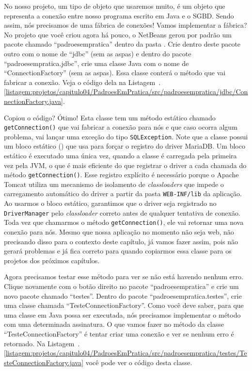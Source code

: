 No nosso projeto, um tipo de objeto que usaremos muito, é um objeto que representa a conexão entre nosso programa escrito em Java e o SGBD. Sendo assim, nós precisamos de uma fábrica de conexões! Vamos implementar a fábrica? No projeto que você criou agora há pouco, o NetBeans gerou por padrão um pacote chamado ``padroesempratica'' dentro da pasta . Crie dentro deste pacote outro com o nome de ``jdbc'' (sem as aspas) e dentro do pacote ``padroesempratica.jdbc'', crie uma classe Java com o nome de ``ConnectionFactory'' (sem as aspas). Essa classe conterá o método que vai fabricar a conexão. Veja o código dela na Listagem~\thechapter.\ref{listagem:projetos/capitulo04/PadroesEmPratica/src/padroesempratica/jdbc/ConnectionFactory.java}.


Copiou o código? Ótimo! Esta classe tem um método estático chamado \texttt{getConnection()} que vai fabricar a conexão para nós e que caso ocorra algum problema, vai lançar uma exceção do tipo \texttt{SQLException}. Note que a classe possui um bloco estático () que usa  para forçar o registro do driver MariaDB. Um bloco estático é executado uma única vez, quando a classe é carregada pela primeira vez pela JVM, o que é mais eficiente do que registrar o driver a cada chamada do método \texttt{getConnection()}. Esse registro explícito é necessário porque o Apache Tomcat utiliza um mecanismo de isolamento de \textit{classloaders} que impede o carregamento automático do driver a partir da pasta \texttt{WEB-INF/lib} da aplicação. Ao usarmos o bloco estático, garantimos que o driver seja registrado no \texttt{DriverManager} pelo \textit{classloader} correto antes de qualquer tentativa de conexão. Toda vez que chamarmos o método \texttt{getConnection()}, ele vai retornar uma nova conexão para nós. Mesmo que nossa aplicação no momento não seja web, não precisando disso para o contexto deste capítulo, já vamos fazer assim, pois não gerará problemas e já fica correto para quando copiarmos essa classe para os projetos dos próximos capítulos.

Agora precisamos testar esse método para ver se não está havendo nenhum erro. Clique novamente com o botão direito no pacote ``padroesempratica'' e crie um novo pacote chamado ``testes''. Dentro do pacote ``padroesempratica.testes'', crie uma classe chamada ``TesteConnectionFactory''. Como você deve saber, para que uma classe em Java possa ser executada, nós precisamos implementar o método  com uma determinada assinatura. O que vamos fazer no método  da classe ``TesteConnectionFactory'' é tentar criar uma conexão e ver se nenhum erro é retornado. Na Listagem~\thechapter.\ref{listagem:projetos/capitulo04/PadroesEmPratica/src/padroesempratica/testes/TesteConnectionFactory.java} você pode ver o código desta classe.


